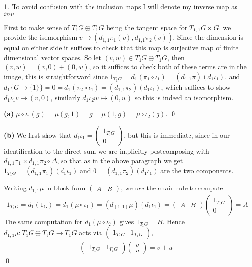\documentclass[10.5pt]{article}
\theoremstyle{definition}
\newtheorem{pb}{}
\newcommand{\set}[1]{\{#1\}}
\begin{document}
    \begin{pb} To avoid confusion with the inclusion maps I will denote my inverse map as \(inv\)

        First to make sense of \(T_1G \oplus T_1G\) being the tangent space for \(T_{1,1}G \times G\), we provide the isomorphism \(v \mapsto (d_{1,1}\pi_1(v),d_{1,1}\pi_2(v))\). Since the dimension is equal on either side it suffices to check that this map is surjective map of finite dimensional vector spaces. So let \((v,w) \in T_1G \oplus T_1G\), then \((v,w) = (v,0) + (0,w)\), so it suffices to check both of these terms are in the image, this is straightforward since \(1_{T_1G} = d_1(\pi_1\circ\iota_1) = (d_{1,1}\pi)(d_1\iota_1)\), and \(d_1\set{G \to \set{1}} = 0 = d_1(\pi_2\circ\iota_1) = (d_{1,1}\pi_2)(d_1\iota_1)\), which suffices to show \(d_1\iota_1 v \mapsto (v,0)\), similarly \(d_1\iota_2 w \mapsto (0,w)\) so this is indeed an isomorphism.

        \textbf{(a)} \(\mu \circ \iota_1(g) = \mu(g,1) = g = \mu(1,g) = \mu\circ \iota_2(g)\). \qed

        \textbf{(b)} We first show that \(d_1 \iota_1 = \begin{pmatrix} 1_{T_1G} \\ 0 \end{pmatrix}\), but this is immediate, since in our identification to the direct sum we are implicitly postcomposing with \(d_{1,1}\pi_1 \times d_{1,1}\pi_2 \circ \Delta\), so that as in the above paragraph we get \(1_{T_1G} = (d_{1,1}\pi_1)(d_1\iota_1)\) and \(0 = (d_{1,1}\pi_2)(d_1\iota_1)\) are the two components.
        
        Writing \(d_{1,1}\mu\) in block form \(\begin{pmatrix} A & B \end{pmatrix}\), we use the chain rule to compute
        \begin{align*}
        1_{T_1G} = d_1(1_G) = d_1 (\mu\circ\iota_1) = (d_{(1,1)}\mu)(d_1\iota_1) = \begin{pmatrix} A & B \end{pmatrix} \begin{pmatrix} 1_{T_1G} \\ 0 \end{pmatrix} = A
        \end{align*}
        The same computation for \(d_1(\mu\circ \iota_2)\) gives \(1_{T_1G} = B\). Hence \(d_{1,1}\mu: T_1G \oplus T_1 G \to T_1G\) acts via \(\begin{pmatrix} 1_{T_1G}&1_{T_1G} \end{pmatrix}\),
        \begin{align*}
            \begin{pmatrix} 1_{T_1G}&1_{T_1G} \end{pmatrix}\begin{pmatrix} v\\u \end{pmatrix} = v + u
        \end{align*} \qed


\end{pb}
\end{document}
